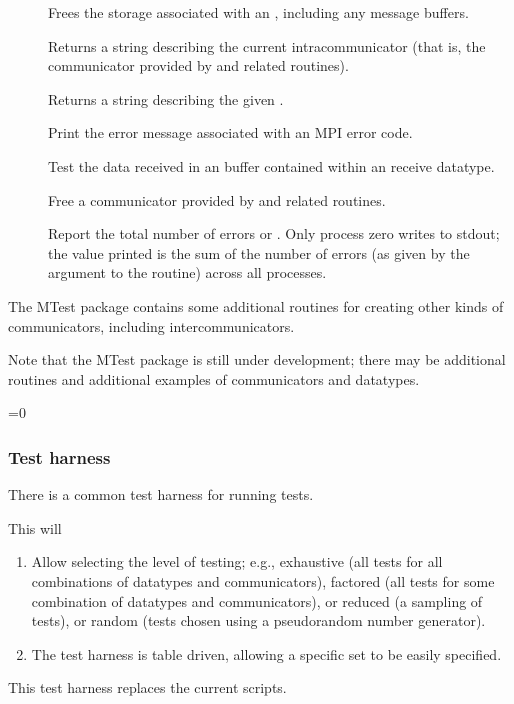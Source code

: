 \begin{description}
\item[]Frees the storage associated with an
    , including any message buffers.

\item[]Returns a string describing the
current intracommunicator (that is, the communicator provided by
 and related routines).

\item[]Returns a string describing the
given .

\item[]Print the error message associated with
an MPI error code.

\item[]Test the data received in an buffer
contained within an  receive datatype.

\item[]Free a communicator provided by
 and related routines.

\item[]Report the total number of errors or
.  Only process zero writes to stdout; the value
printed is the sum of the number of errors (as given by the argument
to the routine) across all processes.
\end{description}

The MTest package contains some additional routines for creating other
kinds of communicators, including intercommunicators.

Note that the MTest package is still under development; there may be
additional routines and additional examples of communicators and
datatypes.  


=0
\subsubsection{Test harness}
There is a common test harness for running tests.  

This will
\begin{enumerate}
\item Allow selecting the level of testing; e.g., exhaustive (all
tests for all combinations of datatypes and communicators), factored
(all tests for some combination of datatypes and communicators), or
reduced (a sampling of tests), or random (tests chosen using a
pseudorandom number generator).  

\item The test harness is table driven, allowing a specific set to be
easily specified.  
\end{enumerate}
This test harness replaces the current  scripts.

